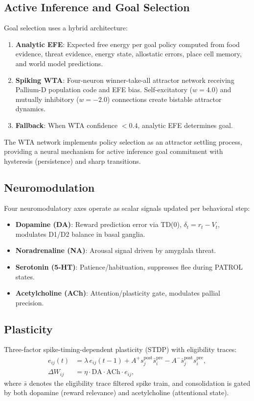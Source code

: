 \documentclass[9pt]{elife}
\begin{document}
\subsection{Active Inference and Goal Selection}

Goal selection uses a hybrid architecture:
\begin{enumerate}
\item \textbf{Analytic EFE}: Expected free energy per goal policy computed from
    food evidence, threat evidence, energy state, allostatic errors,
    place cell memory, and world model predictions.
\item \textbf{Spiking WTA}: Four-neuron winner-take-all attractor network receiving
    Pallium-D population code and EFE bias. Self-excitatory ($w = 4.0$) and
    mutually inhibitory ($w = -2.0$) connections create bistable attractor dynamics.
\item \textbf{Fallback}: When WTA confidence $< 0.4$, analytic EFE determines goal.
\end{enumerate}

The WTA network implements policy selection as an attractor settling process,
providing a neural mechanism for active inference goal commitment
with hysteresis (persistence) and sharp transitions.

\subsection{Neuromodulation}

Four neuromodulatory axes operate as scalar signals updated per behavioral step:
\begin{itemize}
\item \textbf{Dopamine (DA)}: Reward prediction error via TD(0),
    $\delta_t = r_t - V_t$, modulates D1/D2 balance in basal ganglia.
\item \textbf{Noradrenaline (NA)}: Arousal signal driven by amygdala threat.
\item \textbf{Serotonin (5-HT)}: Patience/habituation, suppresses flee during PATROL states.
\item \textbf{Acetylcholine (ACh)}: Attention/plasticity gate, modulates pallial precision.
\end{itemize}

\subsection{Plasticity}

Three-factor spike-timing-dependent plasticity (STDP) with eligibility traces:
\begin{align}
e_{ij}(t) &= \lambda \, e_{ij}(t-1) + A^+ s_j^{\mathrm{post}} \bar{s}_i^{\mathrm{pre}} - A^- \bar{s}_j^{\mathrm{post}} s_i^{\mathrm{pre}}, \\
\Delta W_{ij} &= \eta \cdot \mathrm{DA} \cdot \mathrm{ACh} \cdot e_{ij},
\end{align}
where $\bar{s}$ denotes the eligibility trace filtered spike train,
and consolidation is gated by both dopamine (reward relevance) and
acetylcholine (attentional state).
\end{document}
